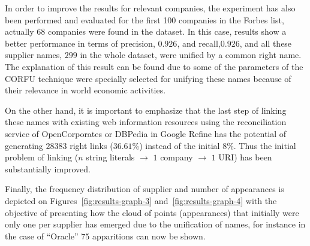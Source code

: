 \documentclass{llncs}
\begin{document}
In order to improve the results for relevant companies, the experiment has also 
been performed and evaluated for the first 100 companies in the Forbes list, actually $68$ companies were 
found in the dataset. In this case, results show a better performance in terms of precision, $0.926$, and recall,$0.926$, and 
all these supplier names, $299$ in the whole dataset, were unified by a common right name. 
The explanation of this result can be found due to some of the parameters of the CORFU technique were specially selected for unifying 
these names because of their relevance in world economic activities.

On the other hand, it is important to emphasize that the last step of linking these names 
with existing web information resources using the reconciliation service of 
OpenCorporates or DBPedia in Google Refine has the potential of generating $28383$ right 
links ($36.61$\%) instead of the initial $8$\%. Thus the initial problem of linking ($n$ string literals $\to$ 
$1$ company $\to$ $1$ URI) has been substantially improved. 

Finally, the frequency distribution of supplier and number of appearances is depicted on Figures~\ref{fig:results-graph-3}
and~\ref{fig:results-graph-4} with the objective of presenting how the cloud of points (appearances) that initially were only one per supplier has 
emerged due to the unification of names, for instance in the case of ``Oracle'' $75$ apparitions can 
now be shown.
\end{document}
